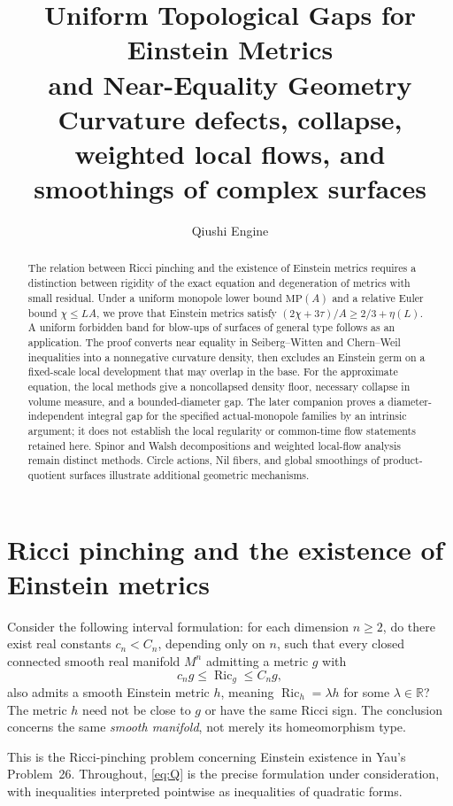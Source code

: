 \documentclass[a4paper,11pt]{article}
\title{Uniform Topological Gaps for Einstein Metrics\\and Near-Equality Geometry\\[0.5em]{\large Curvature defects, collapse, weighted local flows, and smoothings of complex surfaces}}
\author{Qiushi Engine}
\date{}
\numberwithin{equation}{section}
\theoremstyle{definition}
\newcommand{\Ric}{\operatorname{Ric}}
\newcommand{\R}{\mathbb R}
\begin{document}
\maketitle
\begin{abstract}
The relation between Ricci pinching and the existence of Einstein metrics requires a distinction between rigidity of the exact equation and degeneration of metrics with small residual. Under a uniform monopole lower bound $\mathrm{MP}(A)$ and a relative Euler bound $\chi\le LA$, we prove that Einstein metrics satisfy $(2\chi+3\tau)/A\ge2/3+\eta(L)$. A uniform forbidden band for blow-ups of surfaces of general type follows as an application. The proof converts near equality in Seiberg--Witten and Chern--Weil inequalities into a nonnegative curvature density, then excludes an Einstein germ on a fixed-scale local development that may overlap in the base. For the approximate equation, the local methods give a noncollapsed density floor, necessary collapse in volume measure, and a bounded-diameter gap. The later companion  proves a diameter-independent integral gap for the specified actual-monopole families by an intrinsic argument; it does not establish the local regularity or common-time flow statements retained here. Spinor and Walsh decompositions and weighted local-flow analysis remain distinct methods. Circle actions, Nil fibers, and global smoothings of product-quotient surfaces illustrate additional geometric mechanisms.
\end{abstract}
\begingroup
\small\linespread{1.0}\selectfont\setlength{\parskip}{0pt}
\tableofcontents
\endgroup
\clearpage

\section{Ricci pinching and the existence of Einstein metrics}
Consider the following interval formulation: for each dimension $n\ge2$, do there exist real constants $c_n<C_n$, depending only on $n$, such that every closed connected smooth real manifold $M^n$ admitting a metric $g$ with
\begin{equation}\label{eq:Q}
 c_ng\le\Ric_g\le C_ng,
\end{equation}
also admits a smooth Einstein metric $h$, meaning $\Ric_h=\lambda h$ for some $\lambda\in\R$? The metric $h$ need not be close to $g$ or have the same Ricci sign. The conclusion concerns the same \emph{smooth manifold}, not merely its homeomorphism type.

This is the Ricci-pinching problem concerning Einstein existence in Yau's Problem~26\cite{Yau1982}. Throughout, \eqref{eq:Q} is the precise formulation under consideration, with inequalities interpreted pointwise as inequalities of quadratic forms.
\end{document}
